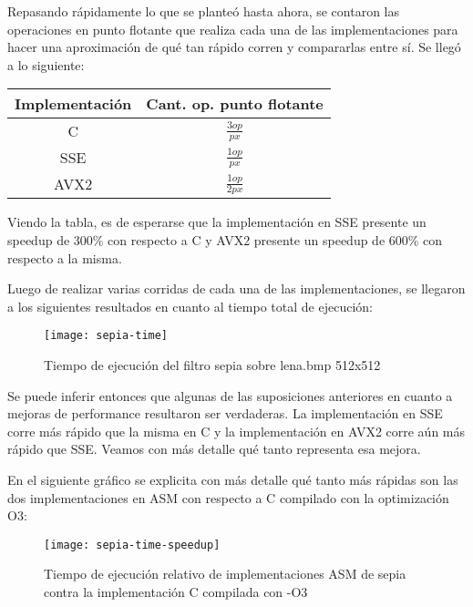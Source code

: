 Repasando rápidamente lo que se planteó hasta ahora, se contaron las operaciones en punto flotante que realiza cada una de las implementaciones para hacer una aproximación de qué tan rápido corren y compararlas entre sí. Se llegó a lo siguiente:

\begin{center}
    \begin{tabular}{ | c | c |}
    \hline
    Implementación & Cant. op. punto flotante  \\ \hline
           C       &     $\frac{3op}{px}$     \\ \hline
          SSE      &     $\frac{1op}{px}$     \\ \hline
          AVX2     &     $\frac{1op}{2px}$     \\ \hline
    \end{tabular}
\end{center}

Viendo la tabla, es de esperarse que la implementación en SSE presente un speedup de 300\% con respecto a C y AVX2 presente un speedup de 600\% con respecto a la misma.

Luego de realizar varias corridas de cada una de las implementaciones, se llegaron a los siguientes resultados en cuanto al tiempo total de ejecución:

\begin{figure}[h]
    \centering
    \texttt{[image: sepia-time]}
    \caption{Tiempo de ejecución del filtro sepia sobre lena.bmp 512x512}
    \label{fig:sepia-time}
\end{figure}

Se puede inferir entonces que algunas de las suposiciones anteriores en cuanto a mejoras de performance resultaron ser verdaderas. La implementación en SSE corre más rápido que la misma en C y la implementación en AVX2 corre aún más rápido que SSE. Veamos con más detalle qué tanto representa esa mejora.

En el siguiente gráfico se explicita con más detalle qué tanto más rápidas son las dos implementaciones en ASM con respecto a C compilado con la optimización O3:

\begin{figure}[h]
    \centering
    \texttt{[image: sepia-time-speedup]}
    \caption{Tiempo de ejecución relativo de implementaciones ASM de sepia contra la implementación C compilada con -O3}
    \label{fig:sepia-time-speedup}
\end{figure}

